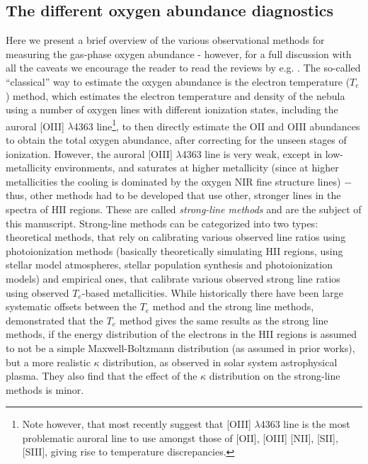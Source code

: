 \documentclass{emulateapj}
\begin{document}
\subsection{The different oxygen abundance diagnostics}

Here we present a brief overview of the various observational methods for measuring the gas-phase oxygen abundance - however, for a full discussion with all the caveats we encourage the reader to read the reviews by e.g. \citet{stasinska02,kewley08,moustakas10,stasinska10,dopita13,blanc15}.
The so-called ``classical'' way to estimate the oxygen abundance is the electron temperature ($T_e$) method, which estimates the electron temperature and density of the nebula using a number of oxygen lines with different ionization states, including the auroral [OIII] $\lambda$4363 line\footnote{Note however, that most recently \citet{berg15} suggest that [OIII] $\lambda$4363 line is the most problematic auroral line to use amongst those of [OII], [OIII] [NII], [SII], [SIII], giving rise to temperature discrepancies.}, to then directly estimate the OII and OIII abundances to obtain the total oxygen abundance, after correcting for the unseen stages of ionization. However, the auroral [OIII] $\lambda$4363 line is very weak, except in low-metallicity environments, and saturates at higher metallicity (since at higher metallicities the cooling is dominated by the oxygen NIR fine structure lines) $-$ thus, other methods had to be developed that use other, stronger lines in the spectra of HII regions. These are called \emph{strong-line methods} and are the subject of this manuscript. Strong-line methods can be categorized into two types: theoretical methods, that rely on calibrating various observed line ratios using photoionization methods (basically theoretically simulating HII regions, using stellar model atmospheres, stellar population synthesis and photoionization models) and empirical ones, that calibrate various observed strong line ratios using observed $T_e$-based metallicities. While historically there have been large systematic offsets between the $T_e$ method and the strong line methods, \citet{dopita13} demonstrated that the $T_e$ method gives the same results as the strong line methods, if the energy distribution of the electrons in the HII regions is assumed to not be a simple Maxwell-Boltzmann distribution (as assumed in prior works), but a more realistic $\kappa$ distribution, as observed in solar system astrophysical plasma. They also find that the effect of the $\kappa$ distribution on the strong-line methods is minor. 
\end{document}
